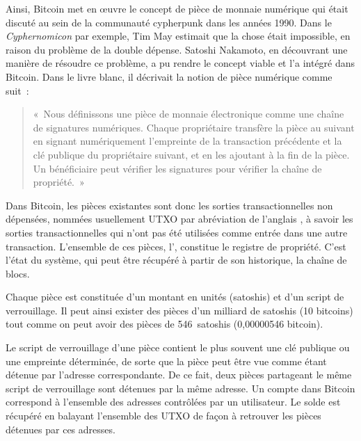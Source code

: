 Ainsi, Bitcoin met en œuvre le concept de pièce de monnaie numérique qui était discuté au sein de la communauté cypherpunk dans les années 1990. Dans le \emph{Cyphernomicon} par exemple, Tim May estimait que la chose était impossible, en raison du problème de la double dépense. Satoshi Nakamoto, en découvrant une manière de résoudre ce problème, a pu rendre le concept viable et l'a intégré dans Bitcoin. Dans le livre blanc, il décrivait la notion de pièce numérique comme suit~:

\begin{quote}
«~Nous définissons une pièce de monnaie électronique comme une chaîne de signatures numériques. Chaque propriétaire transfère la pièce au suivant en signant numériquement l'empreinte de la transaction précédente et la clé publique du propriétaire suivant, et en les ajoutant à la fin de la pièce. Un bénéficiaire peut vérifier les signatures pour vérifier la chaîne de propriété.~»
\end{quote}

Dans Bitcoin, les pièces existantes sont donc les sorties transactionnelles non dépensées, nommées usuellement UTXO par abréviation de l'anglais , à savoir les sorties transactionnelles qui n'ont pas été utilisées comme entrée dans une autre transaction. L'ensemble de ces pièces, l', constitue le registre de propriété. C'est l'état du système, qui peut être récupéré à partir de son historique, la chaîne de blocs.

Chaque pièce est constituée d'un montant en unités (satoshis) et d'un script de verrouillage. Il peut ainsi exister des pièces d'un milliard de satoshis (10 bitcoins) tout comme on peut avoir des pièces de 546~satoshis (0,00000546 bitcoin).

Le script de verrouillage d'une pièce contient le plus souvent une clé publique ou une empreinte déterminée, de sorte que la pièce peut être vue comme étant détenue par l'adresse correspondante. De ce fait, deux pièces partageant le même script de verrouillage sont détenues par la même adresse. Un compte dans Bitcoin correspond à l'ensemble des adresses contrôlées par un utilisateur. Le solde est récupéré en balayant l'ensemble des UTXO de façon à retrouver les pièces détenues par ces adresses.


